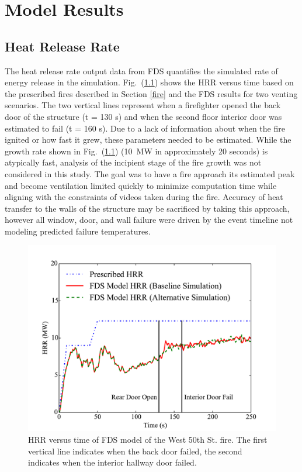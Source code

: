 \documentclass[11pt,oneside]{book}
\begin{document}
\chapter{Model Results}
\label{results}

\section{Heat Release Rate}
\label{HRR}
The heat release rate output data from FDS quantifies the simulated rate of energy release in the simulation. Fig.~(\ref{fig:hrr}) shows the HRR versus time based on the prescribed fires described in Section \ref{fire} and the FDS results for two venting scenarios. The two vertical lines represent when a firefighter opened the back door of the structure (t = 130 s) and when the second floor interior door was estimated to fail (t = 160 s). Due to a lack of information about when the fire ignited or how fast it grew, these parameters needed to be estimated.  While the growth rate shown in Fig.~(\ref{fig:hrr}) (10~MW in approximately 20 seconds) is atypically fast, analysis of the incipient stage of the fire growth was not considered in this study. The goal was to have a fire approach its estimated peak and become ventilation limited quickly to minimize computation time while aligning with the constraints of videos taken during the fire. Accuracy of heat transfer to the walls of the structure may be sacrificed by taking this approach, however all window, door, and wall failure were driven by the event timeline not modeling predicted failure temperatures.

\begin{figure}[h!]
\centering
\includegraphics[width=.80\textwidth]{../Figures/Chicago_Fire_HRR}
\caption{HRR versus time of FDS model of the West 50th St. fire. The first vertical line indicates when the back door failed, the second indicates when the interior hallway door failed.}
\label{fig:hrr}
\end{figure}
\end{document}
